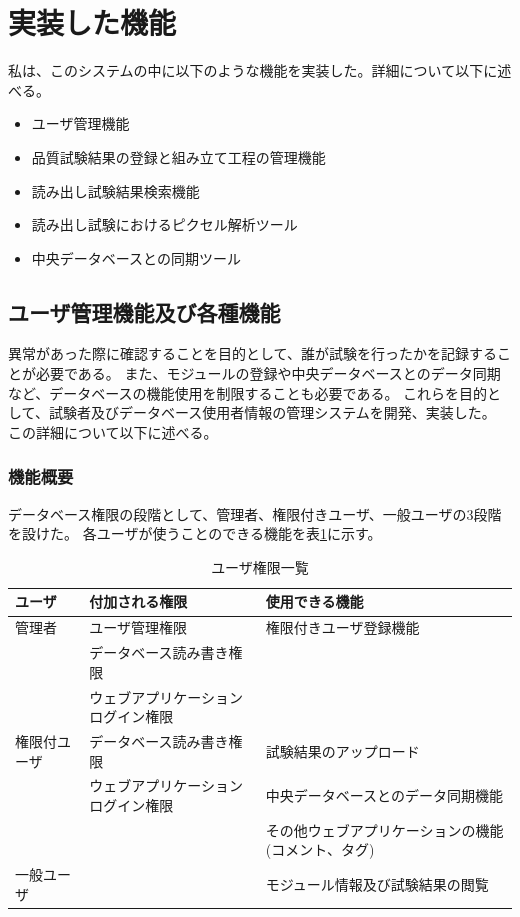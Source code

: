 \section{実装した機能}
私は、このシステムの中に以下のような機能を実装した。詳細について以下に述べる。
\begin{itemize}
  \item ユーザ管理機能
  \item 品質試験結果の登録と組み立て工程の管理機能
  \item 読み出し試験結果検索機能
  \item 読み出し試験におけるピクセル解析ツール
  \item 中央データベースとの同期ツール
\end{itemize}

\subsection{ユーザ管理機能及び各種機能}

異常があった際に確認することを目的として、誰が試験を行ったかを記録することが必要である。
また、モジュールの登録や中央データベースとのデータ同期など、データベースの機能使用を制限することも必要である。
これらを目的として、試験者及びデータベース使用者情報の管理システムを開発、実装した。
この詳細について以下に述べる。

\subsubsection{機能概要}
データベース権限の段階として、管理者、権限付きユーザ、一般ユーザの3段階を設けた。
各ユーザが使うことのできる機能を表\ref{user_functions_summary}に示す。

\begin{table}[tbp]
\begin{center}
\caption[ユーザ権限一覧]{ユーザ権限一覧}
\label{user_functions_summary}
  \begin{tabular}{|lll|} \hline
    ユーザ       & 付加される権限                               & 使用できる機能 \\ \hline
    管理者       & ユーザ管理権限                     & 権限付きユーザ登録機能\\ 
                 & データベース読み書き権限           & \\ 
                 & ウェブアプリケーションログイン権限 & \\ \hline
    権限付ユーザ & データベース読み書き権限           & 試験結果のアップロード\\ 
                 & ウェブアプリケーションログイン権限 & 中央データベースとのデータ同期機能\\ 
                 &                                    & その他ウェブアプリケーションの機能(コメント、タグ)\\ \hline
    一般ユーザ   &                                    & モジュール情報及び試験結果の閲覧　\\ \hline
  \end{tabular}
\end{center}
\end{table}

